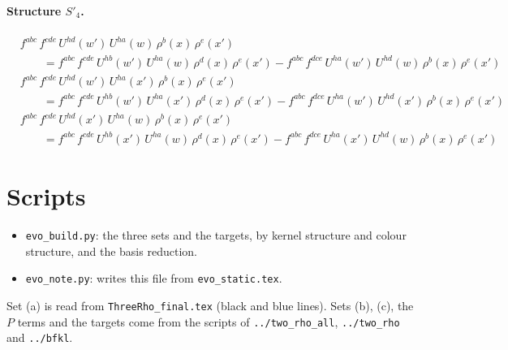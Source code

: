 \documentclass[10pt]{article}
\numberwithin{equation}{section}
\begin{document}
\paragraph{Structure $S'_{4}$.}
\begin{align*}
&f^{abc}\,f^{cde}\,U^{hd}(w')\,U^{ha}(w)\,\rho^{b}(x)\,\rho^{e}(x')\\&\qquad=f^{abc}\,f^{cde}\,U^{hb}(w')\,U^{ha}(w)\,\rho^{d}(x)\,\rho^{e}(x')-f^{abc}\,f^{dce}\,U^{ha}(w')\,U^{hd}(w)\,\rho^{b}(x)\,\rho^{e}(x')\\&f^{abc}\,f^{cde}\,U^{hd}(w')\,U^{ha}(x')\,\rho^{b}(x)\,\rho^{e}(x')\\&\qquad=f^{abc}\,f^{cde}\,U^{hb}(w')\,U^{ha}(x')\,\rho^{d}(x)\,\rho^{e}(x')-f^{abc}\,f^{dce}\,U^{ha}(w')\,U^{hd}(x')\,\rho^{b}(x)\,\rho^{e}(x')\\&f^{abc}\,f^{cde}\,U^{hd}(x')\,U^{ha}(w)\,\rho^{b}(x)\,\rho^{e}(x')\\&\qquad=f^{abc}\,f^{cde}\,U^{hb}(x')\,U^{ha}(w)\,\rho^{d}(x)\,\rho^{e}(x')-f^{abc}\,f^{dce}\,U^{ha}(x')\,U^{hd}(w)\,\rho^{b}(x)\,\rho^{e}(x')
\end{align*}

\section{Scripts}
\begin{itemize}
\item \texttt{evo\_build.py}: the three sets and the targets, by kernel structure and colour structure, and the basis reduction.
\item \texttt{evo\_note.py}: writes this file from \texttt{evo\_static.tex}.
\end{itemize}
Set (a) is read from \texttt{ThreeRho\_final.tex} (black and blue lines). Sets (b), (c), the $P$ terms and the targets come from the scripts of \texttt{../two\_rho\_all}, \texttt{../two\_rho} and \texttt{../bfkl}.
\end{document}
